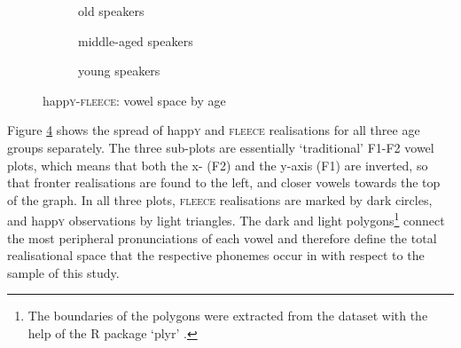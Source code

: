 \begin{figure}[h!]
	\centering
	\begin{subfigure}{.49\textwidth}
		\centering
			\resizebox{\linewidth}{!}{} 
		\caption{old speakers}
		\label{fig.happy.space.old}
	\end{subfigure}
	
	\begin{subfigure}{.49\textwidth}
		\centering
			\resizebox{\linewidth}{!}{} 
		\caption{middle-aged speakers}
		\label{fig.happy.space.mid}
	\end{subfigure}
	\begin{subfigure}{.49\textwidth}
		\centering
			\resizebox{\linewidth}{!}{} 
		\caption{young speakers}
		\label{fig.happy.space.young}
	\end{subfigure}
	\caption{happ\textsc{y}-\textsc{fleece}: vowel space by age}
	\label{fig.happy.space}
\end{figure}

Figure \ref{fig.happy.space} shows the spread of happ\textsc{y} and \textsc{fleece} realisations for all three age groups separately.
The three sub-plots are essentially `traditional' F1-F2 vowel plots, which means that both the x- (F2) and the y-axis (F1) are inverted, so that fronter realisations are found to the left, and closer vowels towards the top of the graph.
In all three plots, \textsc{fleece} realisations are marked by dark circles, and happ\textsc{y} observations by light triangles.
The dark and light polygons\footnote{The boundaries of the polygons were extracted from the dataset with the help of the R package `plyr' \parencite{plyr}.} connect the most peripheral pronunciations of each vowel and therefore define the total realisational space that the respective phonemes occur in with respect to the sample of this study.

